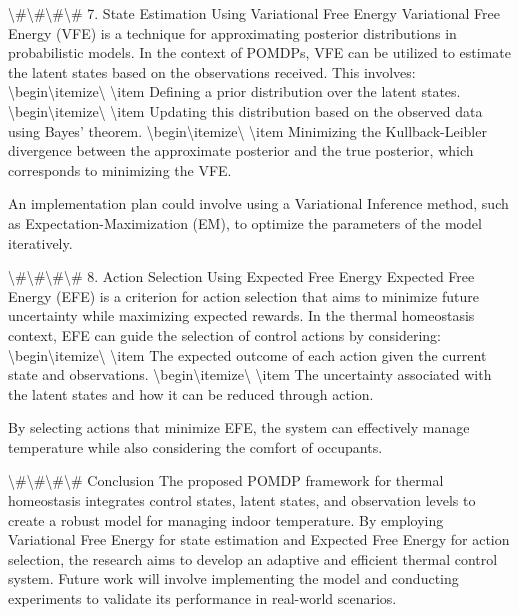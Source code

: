 \documentclass[11pt,a4paper]{article}
\begin{document}
\textbackslash{}#\textbackslash{}#\textbackslash{}#\textbackslash{}# 7. State Estimation Using Variational Free Energy
Variational Free Energy (VFE) is a technique for approximating posterior distributions in probabilistic models. In the context of POMDPs, VFE can be utilized to estimate the latent states based on the observations received. This involves:
\textbackslash{}begin\textbackslash{}{itemize\textbackslash{}}
\textbackslash{}item Defining a prior distribution over the latent states.
\textbackslash{}begin\textbackslash{}{itemize\textbackslash{}}
\textbackslash{}item Updating this distribution based on the observed data using Bayes' theorem.
\textbackslash{}begin\textbackslash{}{itemize\textbackslash{}}
\textbackslash{}item Minimizing the Kullback-Leibler divergence between the approximate posterior and the true posterior, which corresponds to minimizing the VFE.

An implementation plan could involve using a Variational Inference method, such as Expectation-Maximization (EM), to optimize the parameters of the model iteratively.

\textbackslash{}#\textbackslash{}#\textbackslash{}#\textbackslash{}# 8. Action Selection Using Expected Free Energy
Expected Free Energy (EFE) is a criterion for action selection that aims to minimize future uncertainty while maximizing expected rewards. In the thermal homeostasis context, EFE can guide the selection of control actions by considering:
\textbackslash{}begin\textbackslash{}{itemize\textbackslash{}}
\textbackslash{}item The expected outcome of each action given the current state and observations.
\textbackslash{}begin\textbackslash{}{itemize\textbackslash{}}
\textbackslash{}item The uncertainty associated with the latent states and how it can be reduced through action.

By selecting actions that minimize EFE, the system can effectively manage temperature while also considering the comfort of occupants.

\textbackslash{}#\textbackslash{}#\textbackslash{}#\textbackslash{}# Conclusion
The proposed POMDP framework for thermal homeostasis integrates control states, latent states, and observation levels to create a robust model for managing indoor temperature. By employing Variational Free Energy for state estimation and Expected Free Energy for action selection, the research aims to develop an adaptive and efficient thermal control system. Future work will involve implementing the model and conducting experiments to validate its performance in real-world scenarios.
\end{document}
